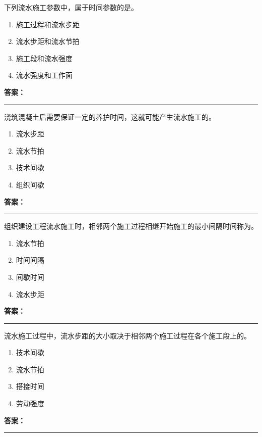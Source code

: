 \documentclass[UTF8,fontset=fandol,11pt]{ctexart}
\newcommand{\answerline}{\textcolor{answerred}{\rule{2.4cm}{0.7pt}}}
\begin{document}
\vspace{0.2em}

\begin{quizbox}[title={第 6 题}]
下列流水施工参数中，属于时间参数的是。\\
\begin{enumerate}[label=\Alph*.]
\item 施工过程和流水步距
\item 流水步距和流水节拍
\item 施工段和流水强度
\item 流水强度和工作面
\end{enumerate}
\textbf{\textcolor{answerred}{答案：}} \answerline
\end{quizbox}

\vspace{0.2em}

\begin{quizbox}[title={第 7 题}]
浇筑混凝土后需要保证一定的养护时间，这就可能产生流水施工的。\\
\begin{enumerate}[label=\Alph*.]
\item 流水步距
\item 流水节拍
\item 技术间歇
\item 组织间歇
\end{enumerate}
\textbf{\textcolor{answerred}{答案：}} \answerline
\end{quizbox}

\vspace{0.2em}

\begin{quizbox}[title={第 8 题}]
组织建设工程流水施工时，相邻两个施工过程相继开始施工的最小间隔时间称为。\\
\begin{enumerate}[label=\Alph*.]
\item 流水节拍
\item 时间间隔
\item 间歇时间
\item 流水步距
\end{enumerate}
\textbf{\textcolor{answerred}{答案：}} \answerline
\end{quizbox}

\vspace{0.2em}

\begin{quizbox}[title={第 9 题}]
流水施工过程中，流水步距的大小取决于相邻两个施工过程在各个施工段上的。\\
\begin{enumerate}[label=\Alph*.]
\item 技术间歇
\item 流水节拍
\item 搭接时间
\item 劳动强度
\end{enumerate}
\textbf{\textcolor{answerred}{答案：}} \answerline
\end{quizbox}
\end{document}
